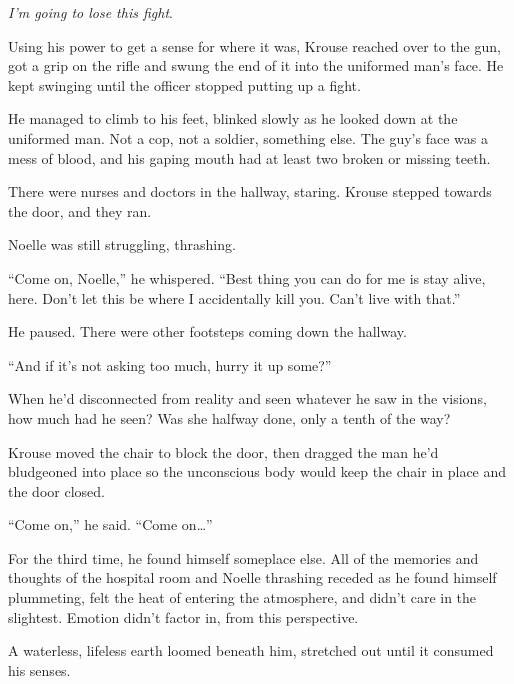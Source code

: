 \emph{I'm going to lose this fight}.



Using his power to get a sense for where it was, Krouse reached over to the gun, got a grip on the rifle and swung the end of it into the uniformed man's face.  He kept swinging until the officer stopped putting up a fight.



He managed to climb to his feet, blinked slowly as he looked down at the uniformed man. Not a cop, not a soldier, something else.  The guy's face was a mess of blood, and his gaping mouth had at least two broken or missing teeth.



There were nurses and doctors in the hallway, staring.  Krouse stepped towards the door, and they ran.



Noelle was still struggling, thrashing.



``Come on, Noelle,'' he whispered.  ``Best thing you can do for me is stay alive, here.  Don't let this be where I accidentally kill you.  Can't live with that.''



He paused.  There were other footsteps coming down the hallway.



``And if it's not asking too much, hurry it up some?''



When he'd disconnected from reality and seen whatever he saw in the visions, how much had he seen?  Was she halfway done, only a tenth of the way?



Krouse moved the chair to block the door, then dragged the man he'd bludgeoned into place so the unconscious body would keep the chair in place and the door closed.



``Come on,'' he said.  ``Come on\ldots''



For the third time, he found himself someplace else.  All of the memories and thoughts of the hospital room and Noelle thrashing receded as he found himself plummeting, felt the heat of entering the atmosphere, and didn't care in the slightest.  Emotion didn't factor in, from this perspective.



A waterless, lifeless earth loomed beneath him, stretched out until it consumed his senses.



